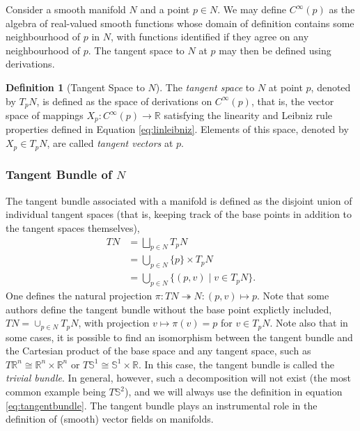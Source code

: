 \documentclass[psamsfonts]{amsart}
\theoremstyle{definition}
\newtheorem{defn}[thm]{Definition}
\theoremstyle{remark}
\newcommand*\R{\mathds{R}}
\numberwithin{equation}{section}
\begin{document}
Consider a smooth manifold $N$ and a point $p \in N$. We may define $C^{\infty}(p)$ as the algebra of real-valued smooth functions whose domain of definition contains some neighbourhood of $p$ in $N$, with functions identified if they agree on any neighbourhood of $p$. The tangent space to $N$ at $p$ may then be defined using derivations. 
\begin{defn}[Tangent Space to $N$]\label{def:tangentspace}
The \textit{tangent space} to $N$ at point $p$, denoted by $T_pN$, is defined as the space of derivations on $C^{\infty}(p)$, that is, the vector space of mappings $X_p: C^{\infty}(p)\rightarrow \R$ satisfying the linearity and Leibniz rule properties defined in Equation \ref{eq:linleibniz}. Elements of this space, denoted by $X_p\in T_pN$, are called \textit{tangent vectors} at $p$. 
\end{defn} 

\subsubsection{Tangent Bundle of $N$}

The tangent bundle associated with a manifold is defined as the disjoint union of individual tangent spaces (that is, keeping track of the base points in addition to the tangent spaces themselves), 
\begin{equation}\label{eq:tangentbundle}
\begin{aligned}
TN & = {} \bigsqcup_{p \in N} T_pN\\
 & = {} \bigcup_{p \in N} \{p\} \times T_pN\\
 & = {} \bigcup_{p \in N} \{(p, v) \mid v \in T_pN\}.
\end{aligned}
\end{equation}
One defines the natural projection $\pi : TN \twoheadrightarrow N : (p, v) \mapsto p$. %
Note that some authors define the tangent bundle without the base point explictly included, $TN = \cup_{p\in N}T_pN$, with projection $v \mapsto \pi(v) = p$ for $v \in T_pN$. Note also that in some cases, it is possible to find an isomorphism between the tangent bundle and the Cartesian product of the base space and any tangent space, such as $T\R^n \cong \R^n \times \R^n$ or $T\mathbb{S}^1 \cong \mathbb{S}^1 \times \R$. In this case, the tangent bundle is called the \textit{trivial bundle}. In general, however, such a decomposition will not exist (the most common example being $T\mathbb{S}^2$), and we will always use the definition in equation \ref{eq:tangentbundle}. The tangent bundle plays an instrumental role in the definition of (smooth) vector fields on manifolds. 
\end{document}
